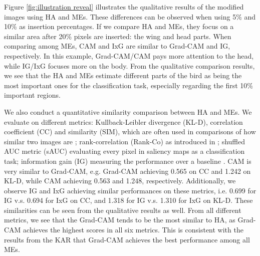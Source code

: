 \documentclass{bmvc2k}
\begin{document}
Figure \ref{fig:illustration reveal} illustrates the qualitative results of the modified images using HA and MEs. These differences can be observed when using 5\% and 10\% as insertion percentages. If we compare HA and MEs, they focus on a similar area after 20\% pixels are inserted: the wing and head parts. When comparing among MEs, CAM and IxG are similar to Grad-CAM and IG, respectively. In this example, Grad-CAM/CAM pays more attention to the head, while IG/IxG focuses more on the body. From the qualitative comparison results, we see that the HA and MEs estimate different parts of the bird as being the most important ones for the classification task, especially regarding the first 10\% important regions. 

We also conduct a quantitative similarity comparison between HA and MEs. We evaluate on different metrics: Kullback-Leibler divergence (KL-D), correlation coefficient (CC) and similarity (SIM), which are often used in comparisons of how similar two images are \cite{bylinskii2018different}; rank-correlation (Rank-Co) as introduced in \cite{das2017human}; shuffled AUC metric (sAUC) evaluating every pixel in saliency maps as a classification task; information gain (IG) measuring the performance over a baseline \cite{bylinskii2018different, qiuxia2020understanding}. CAM is very similar to Grad-CAM, e.g. Grad-CAM achieving 0.565 on CC and 1.242 on KL-D, while CAM achieving 0.563 and 1.248, respectively. Additionally, we observe IG and IxG achieving similar performances on these metrics, i.e. 0.699 for IG v.s. 0.694 for IxG on CC, and 1.318 for IG v.s. 1.310 for IxG on KL-D. These similarities can be seen from the qualitative results as well. From all different metrics, we see that the Grad-CAM tends to be the most similar to HA, as Grad-CAM achieves the highest scores in all six metrics. This is consistent with the results from the KAR that Grad-CAM achieves the best performance among all MEs.

\setlength{\tabcolsep}{3pt}
\renewcommand{\arraystretch}{1.1}
\begin{table}[h]	
	\centering
    \vspace{0.4cm}
    \caption{Similarity comparison between MEs and HA saliency map. 
    ($\downarrow$: the lower the better; $\uparrow$: the higher the better.)
    }
    \label{tab:quantitative}
\end{table}
\end{document}
